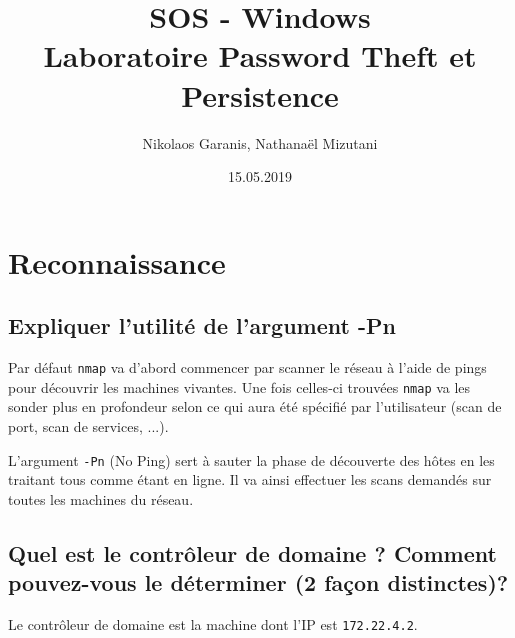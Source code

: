 \documentclass{extarticle} %
\title{SOS - Windows\\Laboratoire Password Theft et Persistence}
\author{Nikolaos Garanis, Nathanaël Mizutani}
\date{15.05.2019}
\begin{document}
    \maketitle

    \section{Reconnaissance}

    \subsection{Expliquer l'utilité de l'argument -Pn}
    Par défaut \texttt{nmap} va d'abord commencer par scanner le réseau à l'aide de pings pour découvrir les machines vivantes.
    Une fois celles-ci trouvées \texttt{nmap} va les sonder plus en profondeur selon ce qui aura été spécifié par l'utilisateur
    (scan de port, scan de services, ...).

    L'argument \texttt{-Pn} (No Ping) sert à sauter la phase de découverte des hôtes en les traitant tous comme étant en ligne.
    Il va ainsi effectuer les scans demandés sur toutes les machines du réseau.

    \subsection{Quel est le contrôleur de domaine ? Comment pouvez-vous le déterminer (2 façon distinctes)?}
    Le contrôleur de domaine est la machine dont l'IP est \texttt{172.22.4.2}.
\end{document}
